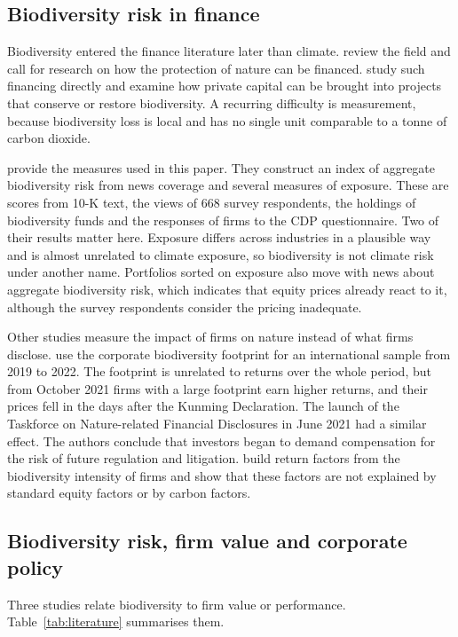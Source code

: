 \documentclass[12pt,a4paper]{article}
\begin{document}
\subsection{Biodiversity risk in finance}

Biodiversity entered the finance literature later than climate. \citet{karolyi2023} review the field and call for research on how the protection of nature can be financed. \citet{flammer2025} study such financing directly and examine how private capital can be brought into projects that conserve or restore biodiversity. A recurring difficulty is measurement, because biodiversity loss is local and has no single unit comparable to a tonne of carbon dioxide.

\citet{giglio2026} provide the measures used in this paper. They construct an index of aggregate biodiversity risk from news coverage and several measures of exposure. These are scores from 10-K text, the views of 668 survey respondents, the holdings of biodiversity funds and the responses of firms to the CDP questionnaire. Two of their results matter here. Exposure differs across industries in a plausible way and is almost unrelated to climate exposure, so biodiversity is not climate risk under another name. Portfolios sorted on exposure also move with news about aggregate biodiversity risk, which indicates that equity prices already react to it, although the survey respondents consider the pricing inadequate.

Other studies measure the impact of firms on nature instead of what firms disclose. \citet{garel2024} use the corporate biodiversity footprint for an international sample from 2019 to 2022. The footprint is unrelated to returns over the whole period, but from October 2021 firms with a large footprint earn higher returns, and their prices fell in the days after the Kunming Declaration. The launch of the Taskforce on Nature-related Financial Disclosures in June 2021 had a similar effect. The authors conclude that investors began to demand compensation for the risk of future regulation and litigation. \citet{coqueret2025} build return factors from the biodiversity intensity of firms and show that these factors are not explained by standard equity factors or by carbon factors.

\subsection{Biodiversity risk, firm value and corporate policy}

Three studies relate biodiversity to firm value or performance. Table~\ref{tab:literature} summarises them.
\end{document}
